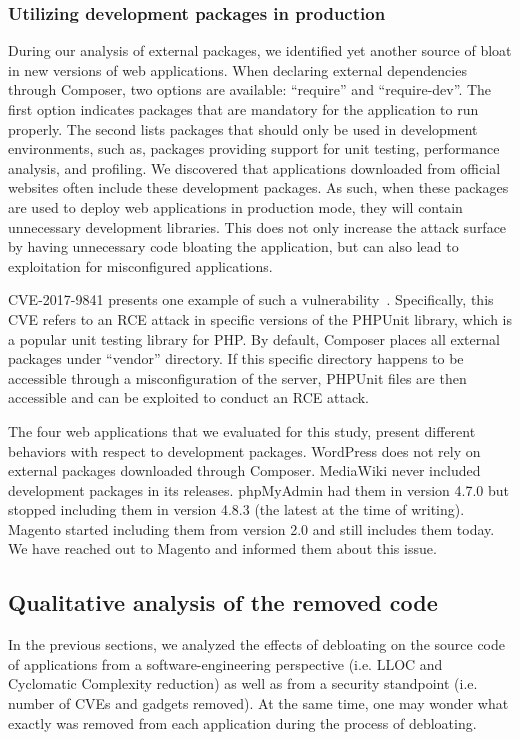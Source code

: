\subsubsection{Utilizing development packages in production}
During our analysis of external packages, we identified yet another source
of bloat in new versions of web applications. When declaring external
dependencies through Composer, two options are available: ``require'' and
``require-dev''. The first option indicates packages that are mandatory for
the application to run properly. The second lists packages that should only be
used in development environments, such as, packages providing support for unit
testing, performance analysis, and profiling. We discovered that applications
downloaded from official websites often include these development packages. As
such, when these packages are used to deploy web applications in production
mode, they will contain unnecessary development libraries. This does not
only increase the attack surface by having unnecessary code bloating the
application, but can also lead to exploitation for misconfigured applications.

CVE-2017-9841 presents one example of such a
vulnerability~\cite{phpunitVulnerability}. Specifically, this CVE refers
to an RCE attack in specific versions of the PHPUnit library, which is
a popular unit testing library for PHP. By default, Composer places all
external packages under ``vendor'' directory. If this specific directory
happens to be accessible through a misconfiguration of the server, PHPUnit
files are then accessible and can be exploited to conduct an RCE attack.

The four web applications that we evaluated for this study, present
different behaviors with respect to development packages. WordPress does not rely on external packages downloaded through Composer.
MediaWiki never
included development packages in its releases. phpMyAdmin had them in version
4.7.0 but stopped including them in version 4.8.3 (the latest at the time of
writing). Magento started including them from version 2.0 and still includes
them today. We have reached out to Magento and informed them about this issue.


\subsection{Qualitative analysis of the removed code}
\label{subsec:qualitative}

In the previous sections, we analyzed the effects of debloating on the source code of applications from a software-engineering perspective (i.e. LLOC and Cyclomatic Complexity reduction) as well as from a security standpoint (i.e. number of CVEs and gadgets removed). At the same time, one may wonder what exactly was removed from each application during the process of debloating.



